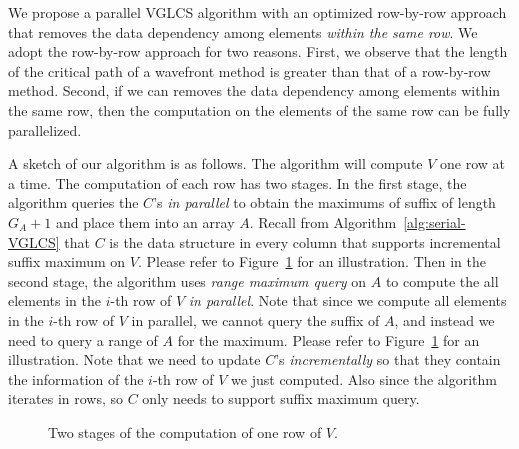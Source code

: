 

We propose a parallel VGLCS algorithm with an optimized row-by-row
approach that removes the data dependency among elements {\em within
  the same row}.  We adopt the row-by-row approach for two reasons.
First, we observe that the length of the critical path of a wavefront
method is greater than that of a row-by-row method.  Second, if we can
removes the data dependency among elements within the same row, then
the computation on the elements of the same row can be fully
parallelized.

A sketch of our algorithm is as follows.  The algorithm will compute
$V$ one row at a time.  The computation of each row has two stages.
In the first stage, the algorithm queries the $C$'s {\em in parallel}
to obtain the maximums of suffix of length $G_A + 1$ and place them
into an array $A$.  Recall from Algorithm~\ref{alg:serial-VGLCS} that
$C$ is the data structure in every column that supports incremental
suffix maximum on $V$.  Please refer to
Figure~\ref{fig:fig-VGLCS-dp-rmq} for an illustration.  Then in the
second stage, the algorithm uses {\em range maximum query} on $A$ to
compute the all elements in the $i$-th row of $V$ {\em in parallel}.
Note that since we compute all elements in the $i$-th row of $V$ in
parallel, we cannot query the suffix of $A$, and instead we need to
query a range of $A$ for the maximum.  Please refer to
Figure~\ref{fig:fig-VGLCS-dp-rmq} for an illustration.  Note that we
need to update $C$'s {\em incrementally} so that they contain the
information of the $i$-th row of $V$ we just computed.  Also since the
algorithm iterates in rows, so $C$ only needs to support suffix
maximum query.

\begin{figure}
  \centering {} 
  \caption{Two stages of the computation of one row of $V$.}
  \label{fig:fig-VGLCS-dp-rmq}
\end{figure}

